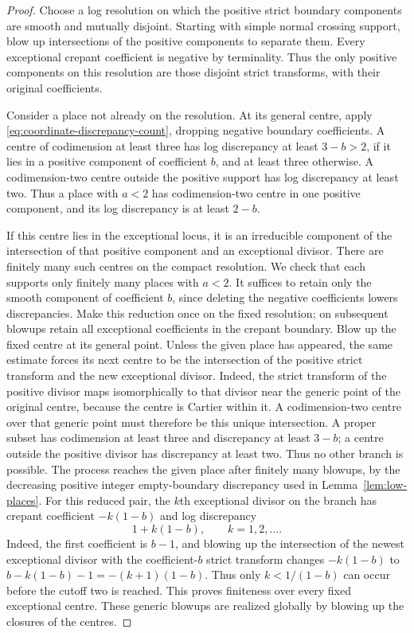\begin{proof}
Choose a log resolution on which the positive strict boundary components
are smooth and mutually disjoint.  Starting with simple normal crossing
support, blow up intersections of the positive components to separate
them.  Every exceptional crepant coefficient is negative by terminality.
Thus the only positive components on this resolution are those disjoint
strict transforms, with their original coefficients.

Consider a place not already on the resolution.  At its general centre,
apply \eqref{eq:coordinate-discrepancy-count}, dropping negative boundary
coefficients.  A centre of codimension at least three has log discrepancy
at least $3-b>2$, if it lies in a positive component of coefficient $b$,
and at least three otherwise.  A codimension-two centre outside the
positive support has log discrepancy at least two.  Thus a place with
$a<2$ has codimension-two centre in one positive component, and its log
discrepancy is at least $2-b$.

If this centre lies in the exceptional locus, it is an irreducible
component of the intersection of that positive component and an
exceptional divisor.  There are finitely many such centres on the compact
resolution.  We check that each supports only finitely many places with
$a<2$.  It suffices to retain only the smooth component of coefficient
$b$, since deleting the negative coefficients lowers discrepancies.
Make this reduction once on the fixed resolution; on subsequent blowups
retain all exceptional coefficients in the crepant boundary.
Blow up the fixed centre at its general point.  Unless the given place
has appeared, the same estimate forces its next centre to be the
intersection of the positive strict transform and the new exceptional
divisor.  Indeed, the strict transform of the positive divisor maps isomorphically
to that divisor near the generic point of the original centre, because
the centre is Cartier within it. A codimension-two centre over that
generic point must therefore be this unique intersection. A proper
subset has codimension at least three and discrepancy at least $3-b$;
a centre outside the positive divisor has discrepancy at least two.
Thus no other branch is possible. The process reaches the given place
after finitely many blowups, by the decreasing positive integer
empty-boundary discrepancy used in Lemma~\ref{lem:low-places}.
For this reduced pair, the $k$th exceptional divisor on the branch has
crepant coefficient $-k(1-b)$ and log discrepancy
\[
 1+k(1-b),\qquad k=1,2,\ldots.
\]
Indeed, the first coefficient is $b-1$, and blowing up the intersection
of the newest exceptional divisor with the coefficient-$b$ strict
transform changes $-k(1-b)$ to $b-k(1-b)-1=-(k+1)(1-b)$.
Thus only
$k<1/(1-b)$ can occur before the cutoff two is reached.  This proves
finiteness over every fixed exceptional centre.  These generic blowups
are realized globally by blowing up the closures of the centres.


\end{proof}
